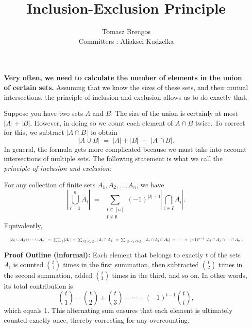 \documentclass[docmute]{article}
\title{Inclusion-Exclusion Principle}
\author{Tomasz Brengos \\  
Committers : Aliaksei Kudzelka}
\date{}
\begin{document}
\maketitle 
\noindent
\textbf{Very often, we need to calculate the number of elements in the union of certain sets.}
Assuming that we know the sizes of these sets, and their mutual intersections, the principle of
inclusion and exclusion allows us to do exactly that.

\medskip

Suppose you have two sets \(A\) and \(B\). The size of the union is certainly at most \(\lvert A\rvert + \lvert B\rvert\). However, in doing so we count each element of \(A \cap B\) twice. To correct for this, we subtract \(\lvert A \cap B\rvert\) to obtain
\[
|A \cup B| \;=\; |A| + |B| \;-\; |A \cap B|.
\]
In general, the formula gets more complicated because we must take into account intersections of multiple sets. The following statement is what we call the \emph{principle of inclusion and exclusion}:

\begin{lemma}
\label{lem:PIE}
For any collection of finite sets \(A_1, A_2, \ldots, A_n\), we have
\[
\left|\bigcup_{i=1}^{n} A_i\right|
\;=\;
\sum_{\substack{I \subseteq [n] \\ I \neq \emptyset}}
(-1)^{\lvert I\rvert + 1}
\left|\bigcap_{i \in I} A_i\right|.
\]
Equivalently,

\[
\resizebox{\textwidth}{!}{$
|A_1 \cup A_2 \cup \cdots \cup A_n|
\;=\;
\sum_{i=1}^n |A_i|
\;-\;
\sum_{1 \le i < j \le n} |A_i \cap A_j|
\;+\;
\sum_{1 \le i < j < k \le n} |A_i \cap A_j \cap A_k|
\;-\;\cdots\;
+\;
(-1)^{n-1}\,\bigl|A_1 \cap A_2 \cap \cdots \cap A_n\bigr|.
$}
\]


\noindent \textbf{Proof Outline (informal):} Each element that belongs to exactly \(t\) of the sets \(A_i\) is counted \(\binom{t}{1}\) times in the first summation, then subtracted \(\binom{t}{2}\) times in the second summation, added \(\binom{t}{3}\) times in the third, and so on. In other words, its total contribution is
\[
\binom{t}{1} - \binom{t}{2} + \binom{t}{3} - \cdots + (-1)^{t-1}\binom{t}{t},
\]
which equals 1. This alternating sum ensures that each element is ultimately counted exactly once, thereby correcting for any overcounting.

\end{lemma}
\end{document}
